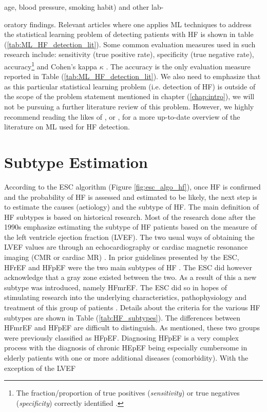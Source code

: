 \documentclass[../thesis.tex]{subfiles}
\begin{document}
age, blood pressure, smoking habit) and other lab-



\noindent oratory findings. Relevant articles where one applies ML techniques to address the statistical learning problem of detecting patients with HF is shown in table (\ref{tab:ML_HF_detection_lit}). Some common evaluation measures used in such research include: sensitivity (true positive rate), specificity (true negative rate), accuracy\footnote{The fraction/proportion of true positives (\textit{sensitivity}) or true negatives (\textit{specificity}) correctly identified \citep{james2013introduction}.} and Cohen's kappa $\kappa$ \citep{cohen1960coefficient}. The accuracy is the only evaluation measure reported in Table (\ref{tab:ML_HF_detection_lit}). We also need to emphasize that as this particular statistical learning problem (i.e. detection of HF) is outside of the scope of the problem statement mentioned in chapter (\ref{chap:intro}), we will not be pursuing a further literature review of this problem. However, we highly recommend reading the likes of \cite{tripoliti2017heart}, \cite{acharya2017application} or \cite{awan2018machine}, for a more up-to-date overview of the literature on ML used for HF detection. 


\section{Subtype Estimation}
\label{sec:subtypeest}

\noindent According to the ESC algorithm (Figure \ref{fig:esc_algo_hf}), once HF is confirmed and the probability of HF is assessed and estimated to be likely, the next step is to estimate the causes (aetiology) and the subtype of HF. The main definition of HF subtypes is based on historical research. Most of the research done after the 1990s emphasize estimating the subtype of HF patients based on the measure of the left ventricle ejection fraction (LVEF). The two usual ways of obtaining the LVEF values are through an echocardiography or cardiac magnetic resonance imaging (CMR or cardiac MR) \citep{ponikowski2016}. In prior guidelines presented by the ESC, HFrEF and HFpEF were the two main subtypes of HF \citep{authors2012esc}. The ESC did however acknowledge that a gray zone existed between the two. As a result of this a new subtype was introduced, namely HFmrEF. The ESC did so in hopes of stimulating research into the underlying characteristics, pathophysiology and treatment of this group of patients \citep{ponikowski2016}. Details about the criteria for the various HF subtypes are shown in Table (\ref{tab:HF_subtypes}). The differences between HFmrEF and HFpEF are difficult to distinguish. As mentioned, these two groups were previously classified as HFpEF. Diagnosing HFpEF is a very complex process with the diagnosis of chronic HEpEF being especially cumbersome in elderly patients with one or more additional diseases (comorbidity). With the exception of the LVEF 
\end{document}
